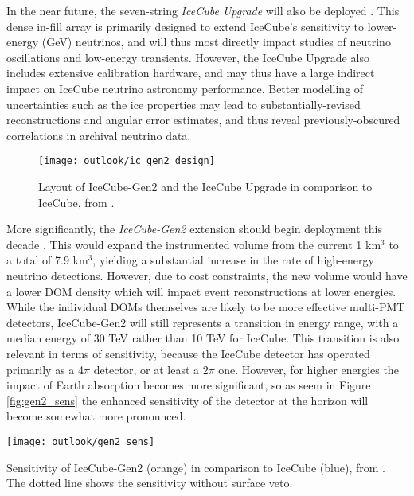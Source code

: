 In the near future, the seven-string \emph{IceCube Upgrade} will also be deployed . This dense in-fill array is primarily designed to extend IceCube's sensitivity to lower-energy (GeV) neutrinos, and will thus most directly impact studies of neutrino oscillations and low-energy transients. However, the IceCube Upgrade also includes extensive calibration hardware, and may thus have a large indirect impact on IceCube neutrino astronomy performance. Better modelling of uncertainties such as the ice properties may lead to substantially-revised reconstructions and angular error estimates, and thus reveal previously-obscured correlations in archival neutrino data.

\begin{figure}
	\centering \texttt{[image: outlook/ic\_gen2\_design]}
	\caption{Layout of IceCube-Gen2 and the IceCube Upgrade in comparison to IceCube, from \cite{ic_gen2_21}.}
	\label{fig:gen2_layout}
\end{figure}

More significantly, the \emph{IceCube-Gen2} extension should begin deployment this decade . This would expand the instrumented volume from the current 1 km$^{3}$ to a total of 7.9 km$^{3}$, yielding  a substantial increase in the rate of high-energy neutrino detections. However, due to cost constraints, the new volume would have a lower DOM density which will impact event reconstructions at lower energies. While the individual DOMs themselves are likely to be more effective multi-PMT detectors, IceCube-Gen2 will still represents a transition in energy range, with a median energy of 30 TeV rather than 10 TeV for IceCube. This transition is also relevant in terms of sensitivity, because the IceCube detector has operated primarily as a 4$\pi$ detector, or at least a $2 \pi$ one. However, for higher energies the impact of Earth absorption becomes more significant, so as seem in Figure \ref{fig:gen2_sens} the enhanced sensitivity of the detector at the horizon will become somewhat more pronounced. 

\begin{marginfigure}
	\centering \texttt{[image: outlook/gen2\_sens]}
	\caption{Sensitivity of IceCube-Gen2 (orange) in comparison to IceCube (blue), from \cite{gen2_icrc}. The dotted line shows the sensitivity without surface veto.} 
	\label{fig:gen2_sens}
\end{marginfigure}

